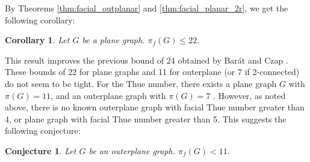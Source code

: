 \documentclass{patmorin}
\newtheorem{corollary}[theorem]{Corollary}
\newtheorem{conjecture}[theorem]{Conjecture}
\begin{document}
By Theorems \ref{thm:facial_outplanar} and \ref{thm:facial_planar_2r}, we get the following corollary:

\begin{corollary}
 Let $G$ be a plane graph. $\pi_f(G) \leq 22$.
 \label{cor:facial_planar}
\end{corollary}

This result improves the previous bound of 24 obtained by Bar{\'a}t and Czap \cite{barat2013facial}.
These bounds of 22 for plane graphs and 11 for outerplane (or 7 if 2-connected) do not seem to be tight. For the Thue number, there exists a plane graph $G$ with $\pi(G) = 11$, and an outerplane graph with $\pi(G)=7$ \cite{barat2007square, dujmovic2012planarlogn}. However, as noted above, there is no known outerplane graph with facial Thue number greater than 4, or plane graph with facial Thue number greater than 5. This suggests the following conjecture:

\begin{conjecture}
 Let $G$ be an outerplane graph. $\pi_f(G) < 11$.
\end{conjecture}





% 
\end{document}

